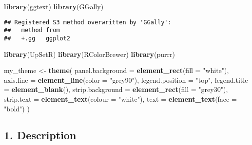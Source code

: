 \documentclass[
]{article}
\newenvironment{Shaded}{\begin{snugshade}}{\end{snugshade}}
\newcommand{\AttributeTok}[1]{\textcolor[rgb]{0.13,0.29,0.53}{#1}}
\newcommand{\FunctionTok}[1]{\textcolor[rgb]{0.13,0.29,0.53}{\textbf{#1}}}
\newcommand{\NormalTok}[1]{#1}
\newcommand{\OtherTok}[1]{\textcolor[rgb]{0.56,0.35,0.01}{#1}}
\newcommand{\StringTok}[1]{\textcolor[rgb]{0.31,0.60,0.02}{#1}}
\begin{document}
\begin{Shaded}
\begin{Highlighting}[]
\FunctionTok{library}\NormalTok{(ggtext)}
\FunctionTok{library}\NormalTok{(GGally)}
\end{Highlighting}
\end{Shaded}

\begin{verbatim}
## Registered S3 method overwritten by 'GGally':
##   method from   
##   +.gg   ggplot2
\end{verbatim}

\begin{Shaded}
\begin{Highlighting}[]
\FunctionTok{library}\NormalTok{(UpSetR)}
\FunctionTok{library}\NormalTok{(RColorBrewer)}
\FunctionTok{library}\NormalTok{(purrr)}


\NormalTok{my\_theme }\OtherTok{\textless{}{-}} 
  \FunctionTok{theme}\NormalTok{( }
  \AttributeTok{panel.background =} \FunctionTok{element\_rect}\NormalTok{(}\AttributeTok{fill =} \StringTok{"white"}\NormalTok{),}
  \AttributeTok{axis.line =} \FunctionTok{element\_line}\NormalTok{(}\AttributeTok{color =} \StringTok{"grey90"}\NormalTok{),}
  \AttributeTok{legend.position =} \StringTok{"top"}\NormalTok{,}
  \AttributeTok{legend.title =} \FunctionTok{element\_blank}\NormalTok{(),}
  \AttributeTok{strip.background =} \FunctionTok{element\_rect}\NormalTok{(}\AttributeTok{fill =} \StringTok{"grey30"}\NormalTok{),}
  \AttributeTok{strip.text =} \FunctionTok{element\_text}\NormalTok{(}\AttributeTok{colour =} \StringTok{"white"}\NormalTok{),}
  \AttributeTok{text =} \FunctionTok{element\_text}\NormalTok{(}\AttributeTok{face =} \StringTok{"bold"}\NormalTok{)}
\NormalTok{)}
\end{Highlighting}
\end{Shaded}

\subsection{1. Description}\label{description}
\end{document}
